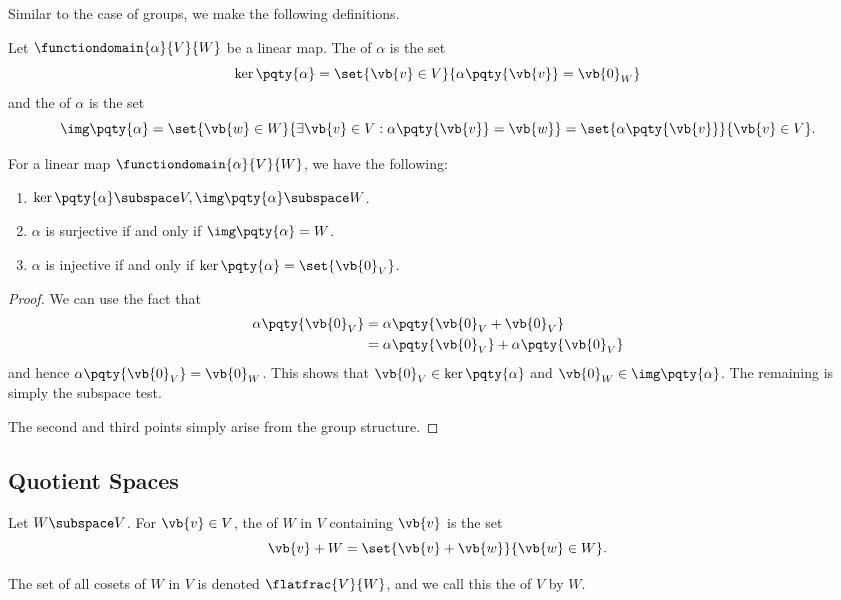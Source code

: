 Similar to the case of groups, we make the following definitions.

\begin{definition}
    Let \(\functiondomain{\alpha}{V}{W}\) be a linear map. The  of \(\alpha\) is the set
    \[
        \ker \pqty{\alpha} = \set{\vb{v} \in V}{\alpha\pqty{\vb{v}} = \vb{0}_W}
    \]
    and the  of \(\alpha\) is the set
    \[
        \img \pqty{\alpha} = \set{\vb{w} \in W}{\exists \vb{v} \in V: \alpha\pqty{\vb{v}} = \vb{w}} = \set{\alpha\pqty{\vb{v}}}{\vb{v} \in V}.
    \]
\end{definition}

\begin{lemma}
    For a linear map \(\functiondomain{\alpha}{V}{W}\), we have the following:
    \begin{enumerate}[label=(\roman*)]
        \item \(\ker\pqty{\alpha} \subspace V, \img\pqty{\alpha} \subspace W\).
        \item \(\alpha\) is surjective if and only if \(\img\pqty{\alpha} = W\).
        \item \(\alpha\) is injective if and only if \(\ker\pqty{\alpha} = \set{\vb{0}_V}\).
    \end{enumerate}
\end{lemma}

\begin{proof}
    We can use the fact that
    \begin{align*}
        \alpha\pqty{\vb{0}_V} &= \alpha\pqty{\vb{0}_V + \vb{0}_V} \\
        &= \alpha\pqty{\vb{0}_V} + \alpha\pqty{\vb{0}_V}
    \end{align*}
    and hence \(\alpha\pqty{\vb{0}_V} = \vb{0}_W\). This shows that \(\vb{0}_V \in \ker\pqty{\alpha}\) and \(\vb{0}_W \in \img\pqty{\alpha}\). The remaining is simply the subspace test.

    The second and third points simply arise from the group structure. 
\end{proof}

\subsection{Quotient Spaces}

\begin{definition}
    Let \(W \subspace V\). For \(\vb{v} \in V\), the  of \(W\) in \(V\) containing \(\vb{v}\) is the set
    \[
        \vb{v} + W = \set{\vb{v} + \vb{w}}{\vb{w} \in W}.
    \]

    The set of all cosets of \(W\) in \(V\) is denoted \(\flatfrac{V}{W}\), and we call this the  of \(V\) by \(W\).
\end{definition}

